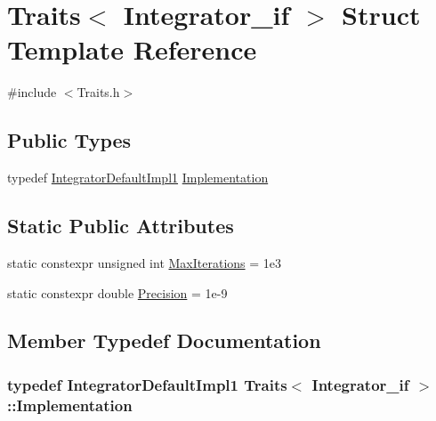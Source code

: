 \hypertarget{struct_traits_3_01_integrator__if_01_4}{}\section{Traits$<$ Integrator\+\_\+if $>$ Struct Template Reference}
\label{struct_traits_3_01_integrator__if_01_4}


{\ttfamily \#include $<$Traits.\+h$>$}

\subsection*{Public Types}
\begin{DoxyCompactItemize}
\item 
typedef \hyperlink{class_integrator_default_impl1}{Integrator\+Default\+Impl1} \hyperlink{struct_traits_3_01_integrator__if_01_4_a05f3e0acf8ae55045c8a56052d6f8a84}{Implementation}
\end{DoxyCompactItemize}
\subsection*{Static Public Attributes}
\begin{DoxyCompactItemize}
\item 
static constexpr unsigned int \hyperlink{struct_traits_3_01_integrator__if_01_4_af5798506f92f1950cc878585b47b1b3d}{Max\+Iterations} = 1e3
\item 
static constexpr double \hyperlink{struct_traits_3_01_integrator__if_01_4_a040fd02afb3cf89c999fd7affeefa70f}{Precision} = 1e-\/9
\end{DoxyCompactItemize}


\subsection{Member Typedef Documentation}
\subsubsection[{\texorpdfstring{Implementation}{Implementation}}]{\setlength{\rightskip}{0pt plus 5cm}typedef {\bf Integrator\+Default\+Impl1} {\bf Traits}$<$ {\bf Integrator\+\_\+if} $>$\+::{\bf Implementation}}\hypertarget{struct_traits_3_01_integrator__if_01_4_a05f3e0acf8ae55045c8a56052d6f8a84}{}\label{struct_traits_3_01_integrator__if_01_4_a05f3e0acf8ae55045c8a56052d6f8a84}


